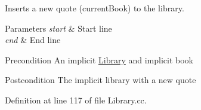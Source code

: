 Inserts a new quote (current\+Book) to the library. 


\begin{DoxyParams}{Parameters}
{\em start} & Start line \\
\hline
{\em end} & End line \\
\hline
\end{DoxyParams}
\begin{DoxyPrecond}{Precondition}
An implicit \hyperlink{class_library}{Library} and implicit book 
\end{DoxyPrecond}
\begin{DoxyPostcond}{Postcondition}
The implicit library with a new quote 
\end{DoxyPostcond}


Definition at line 117 of file Library.\+cc.


